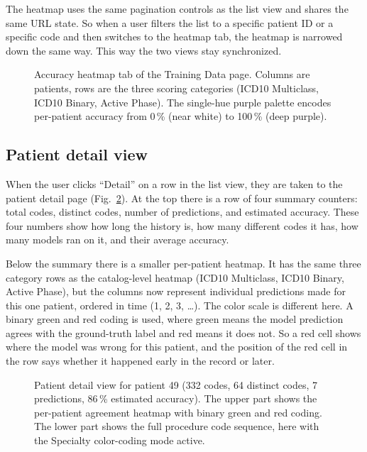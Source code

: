 The heatmap uses the same pagination controls as the list view and shares the same URL state. So when a user filters the list to a specific patient ID or a specific code and then switches to the heatmap tab, the heatmap is narrowed down the same way. This way the two views stay synchronized.

\begin{figure}[h]
    \centering
    \caption{Accuracy heatmap tab of the Training Data page. Columns are patients, rows are the three scoring categories (ICD10 Multiclass, ICD10 Binary, Active Phase). The single-hue purple palette encodes per-patient accuracy from 0\,\% (near white) to 100\,\% (deep purple).}
    \label{fig:catalog-heatmap}
\end{figure}

\subsection{Patient detail view}
\label{sec:results-catalog-detail}

When the user clicks ``Detail'' on a row in the list view, they are taken to the patient detail page (Fig.~\ref{fig:patient-detail}). At the top there is a row of four summary counters: total codes, distinct codes, number of predictions, and estimated accuracy. These four numbers show how long the history is, how many different codes it has, how many models ran on it, and their average accuracy.

Below the summary there is a smaller per-patient heatmap. It has the same three category rows as the catalog-level heatmap (ICD10 Multiclass, ICD10 Binary, Active Phase), but the columns now represent individual predictions made for this one patient, ordered in time (1, 2, 3, \dots). The color scale is different here. A binary green and red coding is used, where green means the model prediction agrees with the ground-truth label and red means it does not. So a red cell shows where the model was wrong for this patient, and the position of the red cell in the row says whether it happened early in the record or later.

\begin{figure}[h]
    \centering
    \caption{Patient detail view for patient 49 (332 codes, 64 distinct codes, 7 predictions, 86\,\% estimated accuracy). The upper part shows the per-patient agreement heatmap with binary green and red coding. The lower part shows the full procedure code sequence, here with the Specialty color-coding mode active.}
    \label{fig:patient-detail}
\end{figure}


